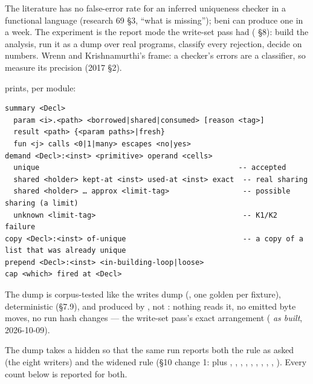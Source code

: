 
The literature has no false-error rate for an inferred uniqueness checker in a functional language (research 69 §3, “what is missing”); beni can produce one in a week. The experiment is the report mode the write-set pass had ( §8): build the analysis, run it as a dump over real programs, classify every rejection, decide on numbers. Wrenn and Krishnamurthi's frame: a checker's errors are a classifier, so measure its precision (2017 §2).


 prints, per module:

\begin{Verbatim}
summary <Decl>
  param <i>.<path> <borrowed|shared|consumed> [reason <tag>]
  result <path> {<param paths>|fresh}
  fun <j> calls <0|1|many> escapes <no|yes>
demand <Decl>:<inst> <primitive> operand <cells>
  unique                                              -- accepted
  shared <holder> kept-at <inst> used-at <inst> exact  -- real sharing
  shared <holder> … approx <limit-tag>                 -- possible sharing (a limit)
  unknown <limit-tag>                                  -- K1/K2 failure
copy <Decl>:<inst> of-unique                           -- a copy of a list that was already unique
prepend <Decl>:<inst> <in-building-loop|loose>
cap <which> fired at <Decl>
\end{Verbatim}

The dump is corpus-tested like the writes dump (, one golden per fixture), deterministic (§7.9), and produced by , not : nothing reads it, no emitted byte moves, no run hash changes — the write-set pass's exact arrangement ( \emph{as built}, 2026-10-09).


The dump takes a hidden  so that the same run reports both the rule as asked (the eight writers) and the widened rule (§10 change 1: plus , , , , , , , , , ). Every count below is reported for both.

